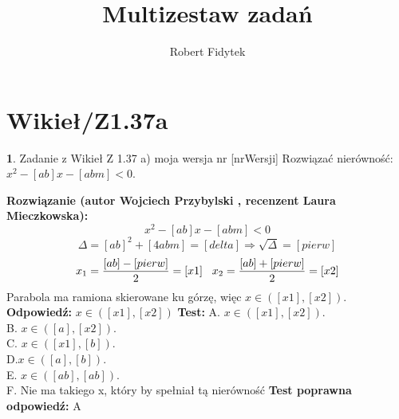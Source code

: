 \documentclass[12pt, a4paper]{article}
\title{Multizestaw zadań}
\author{Robert Fidytek}
\date{}
\theoremstyle{definition} %
\newtheorem{zad}{}
\newcommand{\kategoria}[1]{\section{#1}} %
\newcommand{\zadStart}[1]{\begin{zad}#1\newline} %
\newcommand{\zadStop}{\end{zad}}   %
\newcommand{\rozwStart}[2]{\noindent \textbf{Rozwiązanie (autor #1 , recenzent #2): }\newline} %
\newcommand{\rozwStop}{\newline}                                            %
\newcommand{\odpStart}{\noindent \textbf{Odpowiedź:}\newline}    %
\newcommand{\odpStop}{\newline}                                             %
\newcommand{\testStart}{\noindent \textbf{Test:}\newline} %
\newcommand{\testStop}{\newline} %
\newcommand{\kluczStart}{\noindent \textbf{Test poprawna odpowiedź:}\newline} %
\newcommand{\kluczStop}{\newline} %
\begin{document}
\maketitle


\kategoria{Wikieł/Z1.37a}
\zadStart{Zadanie z Wikieł Z 1.37 a) moja wersja nr [nrWersji]}
Rozwiązać nierówność: $x^{2}-[ab]x-[abm]<0$.
\zadStop
\rozwStart{Wojciech Przybylski}{Laura Mieczkowska}
$$x^{2}-[ab]x-[abm]<0$$
$$\Delta=[ab]^{2}+[4abm]=[delta] \Rightarrow \sqrt{\Delta}=[pierw]$$
$$x_{1}=\frac{[ab]-[pierw]}{2}=[x1] \hspace{3mm} x_{2}=\frac{[ab]+[pierw]}{2}=[x2]$$
Parabola ma ramiona skierowane ku górzę, więc $x \in ([x1],[x2])$.
\rozwStop
\odpStart
$x \in ([x1],[x2])$
\odpStop
\testStart
A. $x \in ([x1],[x2])$.\\
B. $x \in ([a],[x2])$.\\
C. $x \in ([x1],[b])$.\\
D.$x \in ([a],[b])$.\\
E. $x \in ([ab],[ab])$.\\
F. Nie ma takiego x, który by spełniał tą nierówność
\testStop
\kluczStart
A
\kluczStop
\end{document}
